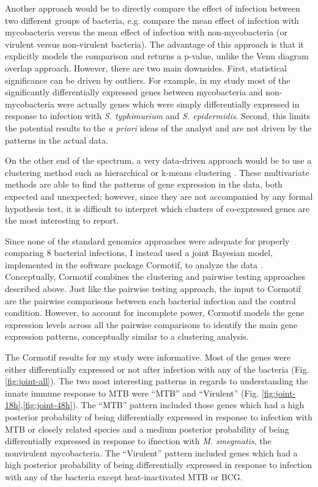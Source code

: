 Another approach would be to directly compare the effect of infection between
two different groups of bacteria, e.g. compare the mean effect of infection  with mycobacteria versus the
mean effect of infection with non-mycobacteria (or virulent versus non-virulent bacteria). The advantage of this
approach is that it explicitly models the comparison and returns a p-value,
unlike the Venn diagram overlap approach. However, there are two main
downsides. First, statistical significance can be driven by outliers. For
example, in my study most of the significantly differentially expressed genes between
mycobacteria and non-mycobacteria were actually genes which were simply
differentially expressed in response to infection with \emph{S. typhimurium} and
\emph{S. epidermidis}. Second, this limits the potential results to the \emph{a priori}
ideas of the analyst and are not driven by the patterns in the actual data.

On the other end of the spectrum, a very data-driven approach would be to use a
clustering method such as hierarchical or k-means clustering \citep{Eisen1998, Michaels1998}. These multivariate
methods are able to find the patterns of gene expression in the data, both
expected and unexpected; however, since they are not accompanied by any formal
hypothesis test, it is difficult to interpret which clusters of co-expressed
genes are the most interesting to report.

Since none of the standard genomics approaches were adequate for properly
comparing 8 bacterial infections, I instead used a joint Bayesian model,
implemented in the software package Cormotif, to analyze the data \citep{Wei2015}. Conceptually,
Cormotif combines the clustering and pairwise testing approaches described
above. Just like the pairwise testing approach, the input to Cormotif are the
pairwise comparisons between each bacterial infection and the control
condition. However, to account for incomplete power, Cormotif models the gene
expression levels across all the pairwise comparisons to identify the main gene
expression patterns, conceptually similar to a clustering analysis.

The Cormotif results for my study were informative. Most of the genes were
either differentially expressed or not after infection with any of the
bacteria (Fig. \ref{fig:joint-all}). The two most interesting patterns in regards to understanding the
innate immune response to MTB were ``MTB'' and ``Virulent'' (Fig. \ref{fig:joint-18h},\ref{fig:joint-48h}).  The ``MTB'' pattern included
those genes which had a high posterior probability of being differentially
expressed in response to infection with MTB or closely related species and a medium posterior
probability of being differentially expressed in response to ifnection with \emph{M. smegmatis}, the
nonvirulent mycobacteria. The ``Virulent'' pattern included genes which had a high
posterior probability of being differentially expressed in response to infection
with any of the bacteria except heat-inactivated MTB or BCG.

